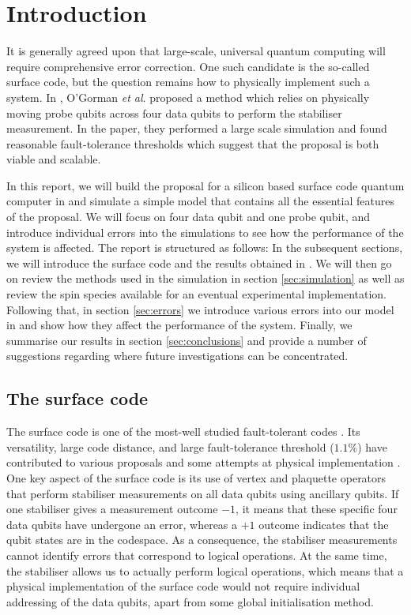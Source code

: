 \section{Introduction} \label{sec:introduction}

It is generally agreed upon that large-scale, universal quantum computing will require comprehensive error correction. One such candidate is the so-called surface code, but the question remains how to physically implement such a system. In \cite{OGorman2016}, O'Gorman \textit{et al}. proposed a method which relies on physically moving probe qubits across four data qubits to perform the stabiliser measurement. In the paper, they performed a large scale simulation and found reasonable fault-tolerance thresholds which suggest that the proposal is both viable and scalable. 

In this report, we will build the proposal for a silicon based surface code quantum computer in  \cite{OGorman2016} and simulate a simple model that contains all the essential features of the proposal. We will focus on four data qubit and one probe qubit, and introduce individual errors into the simulations to see how the performance of the system is affected. 
The report is structured as follows: In the subsequent sections, we will introduce the surface code and the results obtained in \citet{OGorman2016}. We will then go on review the methods used in the simulation in section \@ \ref{sec:simulation} as well as review the spin species available for an eventual experimental implementation. Following that, in section \@ \ref{sec:errors} we introduce various errors into our model in and show how they affect the performance of the system. Finally, we summarise our results in section \@ \ref{sec:conclusions} and provide a number of suggestions regarding where future investigations can be concentrated. 

\subsection{The surface code}
The surface code is one of the most-well studied fault-tolerant codes \cite{Wang2011,Fowler2012}. Its versatility, large code distance, and large fault-tolerance threshold ($1.1\%$) have contributed to various proposals \cite{Fowler2012,Pica2014,Tosi2015,Hill2015,OGorman2016} and some attempts at physical implementation \cite{Barends2014,Kelly2015}. One key aspect of the surface code is its use of vertex and plaquette operators that perform stabiliser measurements on all data qubits using ancillary qubits. If one stabiliser gives a measurement outcome $-1$, it means that these specific four data qubits have undergone an error, whereas a $+1$ outcome indicates that the qubit states are in the codespace. As a consequence, the stabiliser measurements cannot identify errors that correspond to logical operations. At the same time, the stabiliser allows us to actually perform logical operations, which means that a physical implementation of the surface code would not require individual addressing of the data qubits, apart from some global initialisation method. 

